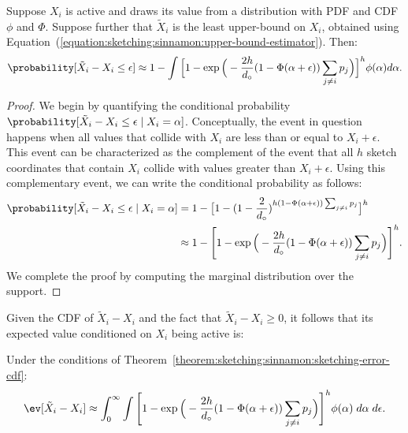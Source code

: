 \begin{theorem}
    \label{theorem:sketching:sinnamon:sketching-error-cdf}
    Suppose $X_i$ is active and draws its value from a distribution with PDF and CDF $\phi$ and $\Phi$.
    Suppose further that $\tilde{X}_i$ is the least upper-bound on $X_i$, obtained
    using Equation~(\ref{equation:sketching:sinnamon:upper-bound-estimator}).
    Then:
    \begin{equation*}
        \probability[\tilde{X}_i - X_i \leq \epsilon] \approx
        1 - \int \Big[ 1 - \exp\Big(-\frac{2h}{d_\circ} (1 - \Phi(\alpha + \epsilon)) \sum_{j \neq i} p_j \Big) \Big]^h \phi(\alpha) d \alpha.
    \end{equation*}
\end{theorem}
\begin{proof}
We begin by quantifying the conditional probability
$\probability[\tilde{X}_i - X_i \leq \epsilon \;|\; X_i = \alpha]$.
Conceptually, the event in question happens when all values that collide
with $X_i$ are less than or equal to $X_i + \epsilon$.
This event can be characterized as the complement of the event that
all $h$ sketch coordinates that contain $X_i$ collide with values greater
than $X_i + \epsilon$. Using this complementary event, we can write the
conditional probability as follows:
\begin{align*}
    \probability[\tilde{X}_i - X_i \leq \epsilon \;|\; X_i = \alpha] &=
    1 - \big[ 1 - (1 - \frac{2}{d_\circ})^{h (1 - \Phi(\alpha + \epsilon)) \sum_{j \neq i} p_j} \big]^h \\
    &\approx 1 - \Bigg[ 1 - \exp\Big(-\frac{2h}{d_\circ} (1 - \Phi(\alpha + \epsilon)) \sum_{j \neq i} p_j \Big) \Bigg]^h.
\end{align*}
We complete the proof by computing the marginal distribution over the support.
\end{proof}

Given the CDF of $\tilde{X}_i - X_i$ and the fact that $\tilde{X}_i - X_i \geq 0$,
it follows that its expected value conditioned on $X_i$ being active is:

\begin{lemma}
Under the conditions of Theorem~\ref{theorem:sketching:sinnamon:sketching-error-cdf}:
\begin{align*}
    \ev[\tilde{X}_i - X_i]
    \approx \int_{0}^{\infty} \int \Bigg[ 1 - \exp\Big(-\frac{2h}{d_\circ} (1 - \Phi(\alpha + \epsilon)) \sum_{j \neq i} p_j \Big) \Bigg]^h \phi(\alpha)\; d\alpha \; d\epsilon.
\end{align*}
\end{lemma}

